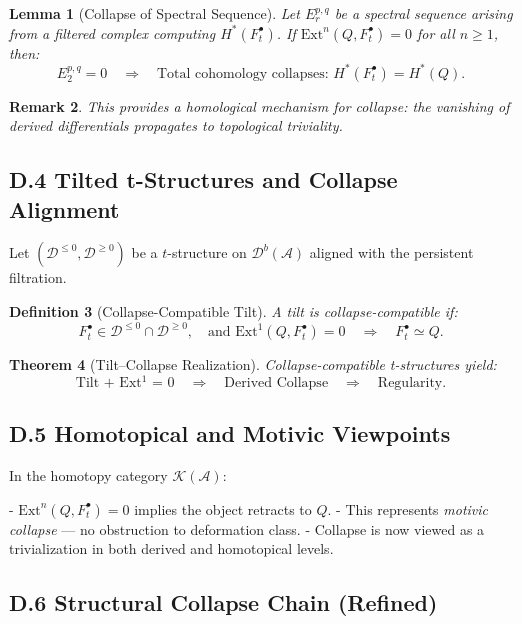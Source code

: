 \documentclass[11pt]{article}
\newtheorem{theorem}{Theorem}[section]
\newtheorem{definition}[theorem]{Definition}
\newtheorem{remark}[theorem]{Remark}
\newtheorem{lemma}[theorem]{Lemma}
\begin{document}
\begin{lemma}[Collapse of Spectral Sequence]
Let $E_r^{p,q}$ be a spectral sequence arising from a filtered complex computing $H^*(F^\bullet_t)$.  
If $\mathrm{Ext}^n(Q, F^\bullet_t) = 0$ for all $n \geq 1$, then:
\[
E_2^{p,q} = 0 \quad \Rightarrow \quad \text{Total cohomology collapses: } H^*(F^\bullet_t) = H^*(Q).
\]
\end{lemma}

\begin{remark}
This provides a homological mechanism for collapse: the vanishing of derived differentials propagates to topological triviality.
\end{remark}

\subsection*{D.4 Tilted t-Structures and Collapse Alignment}

Let $(\mathcal{D}^{\leq 0}, \mathcal{D}^{\geq 0})$ be a $t$-structure on $\mathcal{D}^b(\mathcal{A})$ aligned with the persistent filtration.

\begin{definition}[Collapse-Compatible Tilt]
A tilt is collapse-compatible if:
\[
F^\bullet_t \in \mathcal{D}^{\leq 0} \cap \mathcal{D}^{\geq 0},\quad \text{and } \mathrm{Ext}^1(Q, F^\bullet_t) = 0 \quad \Rightarrow \quad F^\bullet_t \simeq Q.
\]
\end{definition}

\begin{theorem}[Tilt–Collapse Realization]
Collapse-compatible t-structures yield:
\[
\text{Tilt + Ext$^1$ = 0} \quad \Rightarrow \quad \text{Derived Collapse} \quad \Rightarrow \quad \text{Regularity}.
\]
\end{theorem}

\subsection*{D.5 Homotopical and Motivic Viewpoints}

In the homotopy category $\mathcal{K}(\mathcal{A})$:

- $\mathrm{Ext}^n(Q, F^\bullet_t) = 0$ implies the object retracts to $Q$.
- This represents \emph{motivic collapse} — no obstruction to deformation class.
- Collapse is now viewed as a trivialization in both derived and homotopical levels.

\subsection*{D.6 Structural Collapse Chain (Refined)}
\end{document}
